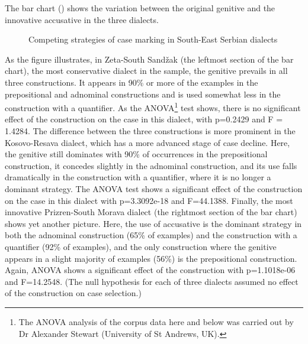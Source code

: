 \documentclass[output=paper]{langscibook}
\begin{document}
The bar chart () shows the variation between the original genitive and the innovative accusative in the three dialects.

  
 

\begin{figure}
\caption{Competing strategies of case marking in South-East Serbian dialects}
\label{fig:key:2}
\end{figure}

As the figure illustrates, in Zeta-South Sandžak (the leftmost section of the bar chart), the most conservative dialect in the sample, the genitive prevails in all three constructions. It appears in 90\% or more of the examples in the prepositional and adnominal constructions and is used somewhat less in the construction with a quantifier. As the ANOVA\footnote{The ANOVA analysis of the corpus data here and below was carried out by Dr Alexander Stewart (University of St Andrews, UK).} test shows, there is no significant effect of the construction on the case in this dialect, with p=0.2429 and F = 1.4284. The difference between the three constructions is more prominent in the Kosovo-Resava dialect, which has a more advanced stage of case decline. Here, the genitive still dominates with 90\% of occurrences in the prepositional construction, it concedes slightly in the adnominal construction, and its use falls dramatically in the construction with a quantifier, where it is no longer a dominant strategy. The ANOVA test shows a significant effect of the construction on the case in this dialect with p=3.3092e-18 and F=44.1388. Finally, the most innovative Prizren-South Morava dialect (the rightmost section of the bar chart) shows yet another picture. Here, the use of accusative is the dominant strategy in both the adnominal construction (65\% of examples) and the construction with a quantifier (92\% of examples), and the only construction where the genitive appears in a slight majority of examples (56\%) is the prepositional construction. Again, ANOVA shows a significant effect of the construction with p=1.1018e-06 and F=14.2548. (The null hypothesis for each of three dialects assumed no effect of the construction on case selection.)
\end{document}
